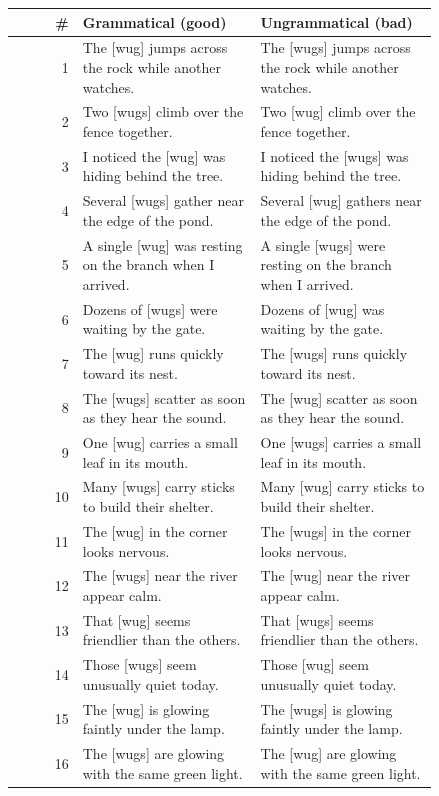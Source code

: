\begin{table}[p]
\centering
\footnotesize
\begin{tabular}{@{}rp{0.42\linewidth}p{0.42\linewidth}@{}}
\hline
\# & Grammatical (good) & Ungrammatical (bad) \\
\hline
1 & The {[}wug{]} jumps across the rock while another watches. & The {[}wugs{]} jumps across the rock while another watches. \\
2 & Two {[}wugs{]} climb over the fence together. & Two {[}wug{]} climb over the fence together. \\
3 & I noticed the {[}wug{]} was hiding behind the tree. & I noticed the {[}wugs{]} was hiding behind the tree. \\
4 & Several {[}wugs{]} gather near the edge of the pond. & Several {[}wug{]} gathers near the edge of the pond. \\
5 & A single {[}wug{]} was resting on the branch when I arrived. & A single {[}wugs{]} were resting on the branch when I arrived. \\
6 & Dozens of {[}wugs{]} were waiting by the gate. & Dozens of {[}wug{]} was waiting by the gate. \\
7 & The {[}wug{]} runs quickly toward its nest. & The {[}wugs{]} runs quickly toward its nest. \\
8 & The {[}wugs{]} scatter as soon as they hear the sound. & The {[}wug{]} scatter as soon as they hear the sound. \\
9 & One {[}wug{]} carries a small leaf in its mouth. & One {[}wugs{]} carries a small leaf in its mouth. \\
10 & Many {[}wugs{]} carry sticks to build their shelter. & Many {[}wug{]} carry sticks to build their shelter. \\
11 & The {[}wug{]} in the corner looks nervous. & The {[}wugs{]} in the corner looks nervous. \\
12 & The {[}wugs{]} near the river appear calm. & The {[}wug{]} near the river appear calm. \\
13 & That {[}wug{]} seems friendlier than the others. & That {[}wugs{]} seems friendlier than the others. \\
14 & Those {[}wugs{]} seem unusually quiet today. & Those {[}wug{]} seem unusually quiet today. \\
15 & The {[}wug{]} is glowing faintly under the lamp. & The {[}wugs{]} is glowing faintly under the lamp. \\
16 & The {[}wugs{]} are glowing with the same green light. & The {[}wug{]} are glowing with the same green light. \\

\end{tabular}
\end{table}
